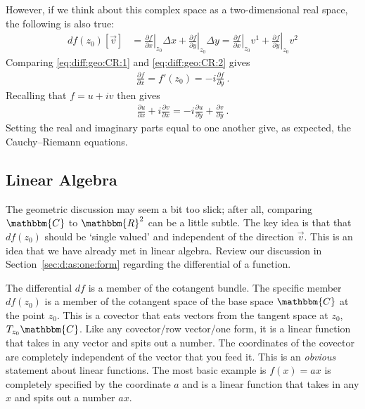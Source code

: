 However, if we think about this complex space as a two-dimensional real space, the following is also true:
\begin{align}
  df(z_0)\left[\vec{v}\right] &=
  \left.\frac{\partial f}{\partial x}\right|_{z_0} \Delta x
  +
  \left.\frac{\partial f}{\partial y}\right|_{z_0} \Delta y
  =
  \left.\frac{\partial f}{\partial x}\right|_{z_0} v^1
  +
  \left.\frac{\partial f}{\partial y}\right|_{z_0} v^2
  \label{eq:diff:geo:CR:2}
\end{align}
Comparing \eqref{eq:diff:geo:CR:1} and \eqref{eq:diff:geo:CR:2} gives 
\begin{align}
  \frac{\partial f}{\partial x} = f'(z_0) = - i\frac{\partial f}{\partial y} \ .
\end{align}
Recalling that $f= u+iv$ then gives
\begin{align}
  \frac{\partial u}{\partial x}
  + i
  \frac{\partial v}{\partial x}
  =
  -i
  \frac{\partial u}{\partial y}
  +
  \frac{\partial v}{\partial y} \ .
\end{align}
Setting the real and imaginary parts equal to one another give, as expected, the Cauchy--Riemann equations. 

\subsection{Linear Algebra}

The geometric discussion may seem a bit too slick; after all, comparing $\mathbbm{C}$ to $\mathbbm{R}^2$ can be a little subtle.  The key idea is that that $df(z_0)$ should be `single valued' and independent of the direction $\vec{v}$. This is an idea that we have already met in linear algebra. Review our discussion in Section~\eqref{sec:d:as:one:form} regarding the differential of a function. 

The differential $df$ is a member of the cotangent bundle. The specific member $df(z_0)$ is a member of the cotangent space of the base space $\mathbbm{C}$ at the point $z_0$. This is a covector that eats vectors from the tangent space at $z_0$, $T_{z_0}\mathbbm{C}$. Like any covector/row vector/one form, it is a linear function that takes in any vector and spits out a number. The coordinates of the covector are completely independent of the vector that you feed it. This is an \emph{obvious} statement about linear functions. The most basic example is $f(x)=ax$ is completely specified by the coordinate $a$ and is a linear function that takes in any $x$ and spits out a number $ax$. 


